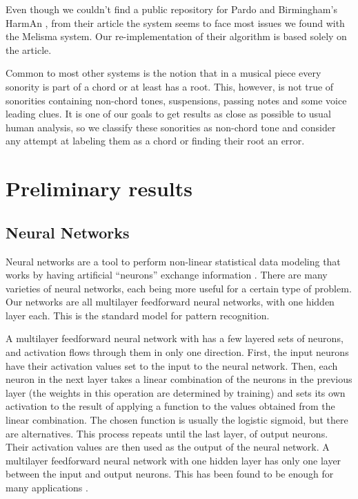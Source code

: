 \documentclass{article}
\begin{document}
Even though we couldn't find a public repository for Pardo and
Birmingham's HarmAn \cite{pardo99:automated}, from their article the
system seems to face most issues we found with the Melisma system. Our
re-implementation of their algorithm is based solely on the article.

Common to most other systems is the notion that in a musical piece
every sonority is part of a chord or at least has a root. This,
however, is not true of sonorities containing non-chord tones,
suspensions, passing notes and some voice leading clues. It is one of
our goals to get results as close as possible to usual human analysis,
so we classify these sonorities as non-chord tone and consider any
attempt at labeling them as a chord or finding their root an error.

\section{Preliminary results}
\label{sec:analysis-results}

\subsection{Neural Networks}
\label{sec:neural-nets}

Neural networks are a tool to perform non-linear statistical data
modeling that works by having artificial ``neurons'' exchange
information \cite{tsui02:_harmon_analy_using_neural_networ}. There are
many varieties of neural networks, each being more useful for a
certain type of problem. Our networks are all multilayer feedforward
neural networks, with one hidden layer each. This is the standard
model for pattern recognition.

A multilayer feedforward neural network with has a few layered sets of
neurons, and activation flows through them in only one
direction. First, the input neurons have their activation values set
to the input to the neural network. Then, each neuron in the next
layer takes a linear combination of the neurons in the previous layer
(the weights in this operation are determined by training) and sets
its own activation to the result of applying a function to the values
obtained from the linear combination. The chosen function is usually
the logistic sigmoid, but there are alternatives. This process repeats
until the last layer, of output neurons. Their activation values are
then used as the output of the neural network. A multilayer
feedforward neural network with one hidden layer has only one layer
between the input and output neurons. This has been found to be enough
for many applications \cite{tsui02:_harmon_analy_using_neural_networ}.
\end{document}
